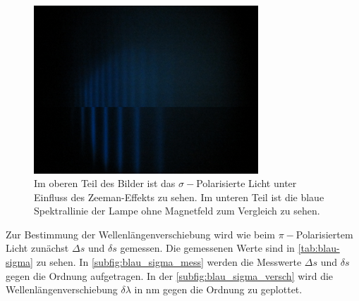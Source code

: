 \begin{figure}
    \centering
    \includegraphics[width=0.75\textwidth]{content/data/Blue_sigma_0_uebernander.JPG}
    \caption{Im oberen Teil des Bilder ist das $\sigma -$Polarisierte Licht unter Einfluss des Zeeman-Effekts zu sehen. Im unteren Teil ist die blaue Spektrallinie der Lampe ohne Magnetfeld zum Vergleich zu sehen.}
    \label{fig:sigma-blau}
\end{figure}

Zur Bestimmung der Wellenlängenverschiebung wird wie beim $\pi -$Polarisiertem Licht zunächst $\Delta s$ und $\delta s$ gemessen.
Die gemessenen Werte sind in \autoref{tab:blau-sigma} zu sehen.
In \autoref{subfig:blau_sigma_mess} werden die Messwerte $\Delta s$ und $\delta s$ gegen die Ordnung aufgetragen.
In der \autoref{subfig:blau_sigma_versch} wird die Wellenlängenverschiebung $\delta \lambda$ in $\si{\nano\meter}$ gegen die Ordnung zu geplottet. 

